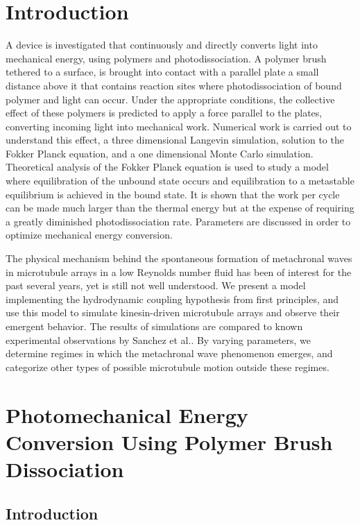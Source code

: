 \documentclass[11pt]{ucthesis}
\begin{document}
\chapter{Introduction}

A device is investigated that continuously and directly converts
light into mechanical energy, using polymers and photodissociation.
A polymer brush tethered to a surface, is brought into contact with a parallel
plate a small distance above it that contains reaction sites where
photodissociation of bound polymer and light can occur. Under the
appropriate conditions, the collective effect of these polymers is
predicted to apply a force parallel to the plates, converting
incoming light into mechanical work. Numerical work is carried out
to understand this effect, a three dimensional Langevin simulation,
solution to the Fokker Planck equation, and a one dimensional Monte
Carlo simulation.  Theoretical analysis of the Fokker Planck equation
is used to study a model where equilibration of the unbound state
occurs and equilibration to a metastable equilibrium is achieved
in the bound state. It is shown that the work per cycle can be made
much larger than the thermal energy but at the expense of requiring
a greatly diminished photodissociation rate. Parameters
are discussed in order to optimize mechanical energy conversion.

The physical mechanism behind the spontaneous formation of metachronal
waves in microtubule arrays in a low Reynolds number fluid has been
of interest for the past several years, yet is still not well
understood. We present a model implementing the hydrodynamic coupling
hypothesis from first principles, and use this model to simulate
kinesin-driven microtubule arrays and observe their emergent behavior.
The results of simulations are compared to known experimental
observations by Sanchez et al.\cite{Sanchez2011,sanchez2013engineering}. By varying
parameters, we determine regimes in which the metachronal wave
phenomenon emerges, and categorize other types of possible microtubule
motion outside these regimes.

\chapter{Photomechanical Energy Conversion Using Polymer Brush Dissociation}

\section{Introduction}
\label{sec:Introduction}
\end{document}
